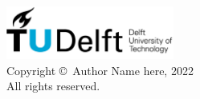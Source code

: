 \begin{flushleft}
  \vspace*{15cm}
  \thispagestyle{empty}
  \noindent%
  \includegraphics[width=55mm]{layout/tudelft/logo.png}\\  
  Copyright \copyright\ Author Name here, 2022 \\
  All rights reserved.
  \cleardoublepage
\end{flushleft}